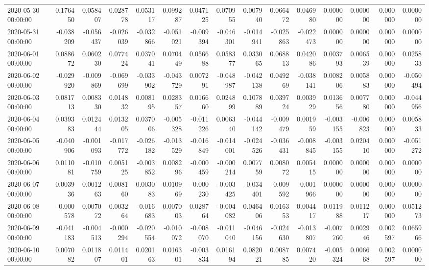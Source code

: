 \begin{tabular}{lrrrrrrrrrrrrrr}
2020-05-30 00:00:00 & 0.176450 & 0.058407 & 0.028778 & 0.053117 & 0.099287 & 0.047125 & 0.070955 & 0.007940 & 0.066472 & 0.046980 & 0.000000 & 0.000000 & 0.000000 & 0.000000 \\
2020-05-31 00:00:00 & -0.038209 & -0.056437 & -0.026039 & -0.032866 & -0.051021 & -0.009394 & -0.046301 & -0.014941 & -0.025863 & -0.022473 & 0.000000 & 0.000000 & 0.000000 & 0.000000 \\
2020-06-01 00:00:00 & 0.088672 & 0.060230 & 0.077424 & 0.037041 & 0.070449 & 0.056688 & 0.058377 & 0.033065 & 0.068813 & 0.042086 & 0.003793 & 0.006539 & 0.000000 & 0.025833 \\
2020-06-02 00:00:00 & -0.029920 & -0.009869 & -0.069699 & -0.033902 & -0.043729 & 0.007291 & -0.048987 & -0.042138 & 0.049269 & -0.038141 & 0.008206 & 0.005883 & 0.000000 & -0.050494 \\
2020-06-03 00:00:00 & 0.081713 & 0.008330 & 0.014832 & 0.008195 & 0.028357 & 0.016660 & 0.024899 & 0.107889 & 0.039724 & 0.003929 & 0.013656 & 0.007780 & 0.000000 & -0.044956 \\
2020-06-04 00:00:00 & 0.039383 & 0.012444 & 0.013205 & 0.037006 & -0.005328 & -0.011226 & 0.006340 & -0.044142 & -0.009479 & 0.001959 & -0.003155 & -0.006823 & 0.000000 & 0.005833 \\
2020-06-05 00:00:00 & -0.040906 & -0.001093 & -0.017772 & -0.026182 & -0.013529 & -0.016849 & -0.014001 & -0.024526 & -0.036431 & -0.008845 & -0.003155 & 0.020410 & 0.000000 & -0.051272 \\
2020-06-06 00:00:00 & 0.011081 & -0.010759 & 0.005125 & -0.003852 & 0.008296 & -0.000459 & -0.000214 & 0.007759 & 0.008072 & 0.005415 & 0.000000 & 0.000000 & 0.000000 & 0.000000 \\
2020-06-07 00:00:00 & 0.003936 & 0.001263 & 0.008160 & 0.003083 & 0.010969 & -0.000230 & -0.003425 & -0.034401 & -0.009592 & -0.001966 & 0.000000 & 0.000000 & 0.000000 & 0.000000 \\
2020-06-08 00:00:00 & -0.000578 & 0.007072 & 0.003264 & -0.016683 & 0.007003 & 0.028764 & -0.004082 & 0.046406 & 0.016353 & 0.004417 & 0.011988 & 0.011217 & 0.000000 & 0.051273 \\
2020-06-09 00:00:00 & -0.041183 & -0.004513 & -0.000294 & -0.020554 & -0.010072 & -0.008070 & -0.011040 & -0.046156 & -0.024630 & -0.013807 & -0.007760 & 0.002946 & 0.002597 & 0.065966 \\
2020-06-10 00:00:00 & 0.007082 & 0.011807 & 0.011401 & 0.020163 & 0.016301 & -0.003834 & 0.016194 & 0.082021 & 0.008785 & 0.007420 & -0.005324 & 0.006668 & 0.002597 & 0.000000 \\

\end{tabular}
